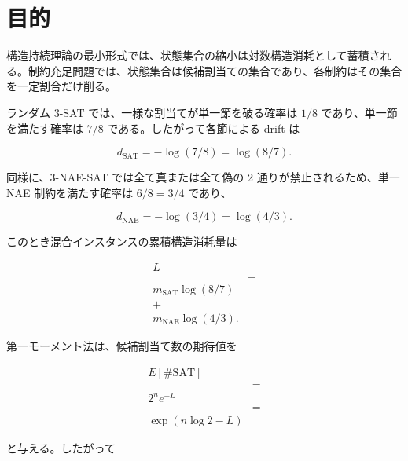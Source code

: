\documentclass[12pt,a4paper]{article}
\begin{document}
\begin{abstract}
外部再実行については、Mixed-CSP の requested outside-group rerun set が 3 名の外部実行者により 3/3 clean success として完了した。さらに Exp43c q-coloring でも、3 名の外部実行者が同じ frozen package を再実行し、それぞれ 4,000 行、checked core mismatches 0、TIMEOUT 0、MALFORMED 0、および同じ qualitative support decision を返した。したがって仕様固定構造層では、Mixed-CSP と Exp43c q-coloring という二つの frozen package について、著者環境外での 3/3 再実行成功が得られている。ただし、これは仕様固定有限系の empirical package の外部再現性を強めるものであり、非CSP branch や理論全体の普遍法則化を単独で閉じるものではない。
\end{abstract}

\section{目的}\label{ux76eeux7684}

構造持続理論の最小形式では、状態集合の縮小は対数構造消耗として蓄積される。制約充足問題では、状態集合は候補割当ての集合であり、各制約はその集合を一定割合だけ削る。

ランダム 3-SAT では、一様な割当てが単一節を破る確率は \(1/8\) であり、単一節を満たす確率は \(7/8\) である。したがって各節による drift は

\[
d_{\mathrm{SAT}}=-\log(7/8)=\log(8/7).
\]

同様に、3-NAE-SAT では全て真または全て偽の 2 通りが禁止されるため、単一 NAE 制約を満たす確率は \(6/8=3/4\) であり、

\[
d_{\mathrm{NAE}}=-\log(3/4)=\log(4/3).
\]

このとき混合インスタンスの累積構造消耗量は

\[
\begin{aligned}
L \\
&= \\
m_{\mathrm{SAT}}\log(8/7) \\
+ \\
m_{\mathrm{NAE}}\log(4/3).
\end{aligned}
\]

第一モーメント法は、候補割当て数の期待値を

\[
\begin{aligned}
E[\#\mathrm{SAT}] \\
&= \\
2^n e^{-L} \\
&= \\
\exp(n\log 2-L)
\end{aligned}
\]

と与える。したがって
\end{document}
